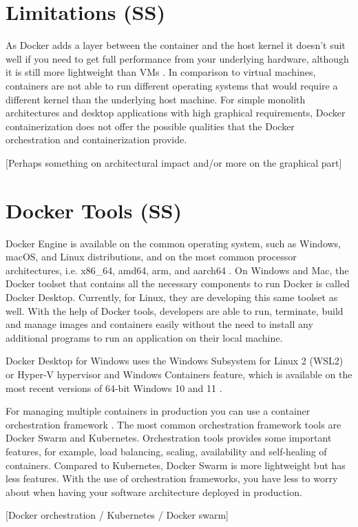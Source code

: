 \documentclass[fleqn,12pt]{olplainarticle}
\begin{document}
\section{Limitations (SS)}

As Docker adds a layer between the container and the host kernel it doesn't suit well if you need to get full performance from your underlying hardware, although it is still more lightweight than VMs \citep{cloudsavvy:not_to_use}. In comparison to virtual machines, containers are not able to run different operating systems that would require a different kernel than the underlying host machine. For simple monolith architectures and desktop applications with high graphical requirements, Docker containerization does not offer the possible qualities that the Docker orchestration and containerization provide.

[Perhaps something on architectural impact and/or more on the graphical part]

\section{Docker Tools (SS)}

Docker Engine is available on the common operating system, such as Windows, macOS, and Linux distributions, and on the most common processor architectures, i.e. x86\_64, amd64, arm, and aarch64 \citep{docker:install}.  On Windows and Mac, the Docker toolset that contains all the necessary components to run Docker is called Docker Desktop. Currently, for Linux, they are developing this same toolset as well. With the help of Docker tools, developers are able to run, terminate, build and manage images and containers easily without the need to install any additional programs to run an application on their local machine.

Docker Desktop for Windows uses the Windows Subsystem for Linux 2 (WSL2) or Hyper-V hypervisor and Windows Containers feature, which is available on the most recent versions of 64-bit Windows 10 and 11 \citep{docker:windows}.

For managing multiple containers in production you can use a container orchestration framework \citep{circleci:swarm_kubernetes}. The most common orchestration framework tools are Docker Swarm and Kubernetes. Orchestration tools provides some important features, for example, load balancing, scaling, availability and self-healing of containers. Compared to Kubernetes, Docker Swarm is more lightweight but has less features. With the use of orchestration frameworks, you have less to worry about when having your software architecture deployed in production.

[Docker orchestration / Kubernetes / Docker swarm]


\end{document}

